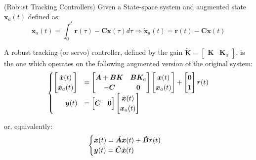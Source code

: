 \documentclass[a4paper,11pt]{book}
\numberwithin{figure}{chapter}
\numberwithin{equation}{chapter}
\numberwithin{table}{chapter}
\theoremstyle{definition}
\newtheorem{definition}{Definition}[chapter]
\newcounter{boxed-theorem}
\newcounter{boxed-definition}
\newenvironment{boxed-definition}[1]
{\begin{shaded} \begin{definition}{#1}}
{\end{definition} \end{shaded}}
\begin{document}
\begin{boxed-definition}{(Robust Tracking Controllers)} \label{def:robustTracking}
	Given a State-space system and augmented state $\bm{x}_a(t)$ defined as:
	\begin{equation}
		\bm{x}_a(t) = \int_{0}^{t} \bm{r}(\tau) - \bm{C} \bm{x}(\tau) d\tau \Longrightarrow \dot{\bm{x}}_a(t) = \bm{r}(t) - \bm{C} \bm{x}(t)
	\end{equation}
	
	A robust tracking (or servo) controller, defined by the gain $\tilde{\bm{K}} = \begin{bmatrix} \bm{K} & \bm{K}_a \end{bmatrix}$, is the one which operates on the following augmented version of the original system:
	\begin{align} \label{eq:augmentedSystem}
	\begin{cases}
		\begin{bmatrix}
			\dot{\bm{x}}(t) \\
			\dot{\bm{x}}_a(t)
		\end{bmatrix} &= \begin{bmatrix}
			\bm{A} + \bm{B} \bm{K} & \bm{B} \bm{K}_a \\ - \bm{C} & \bm{0}
		\end{bmatrix} \begin{bmatrix}
			\bm{x}(t) \\
			\bm{x}_a(t)
		\end{bmatrix} + \begin{bmatrix}
			\bm{0} \\
			\bm{1}
		\end{bmatrix} \bm{r}(t)
		\\
		\hfill \bm{y}(t) &= \begin{bmatrix}
			\bm{C} & \bm{0}
		\end{bmatrix} \begin{bmatrix}
			\bm{x}(t) \\
			\bm{x}_a(t)
		\end{bmatrix}
	\end{cases}
	\end{align}
	
	or, equivalently:
	\begin{align}
	\begin{cases}
		\tilde{\bm{x}}(t) = \tilde{\bm{A}} \tilde{\bm{x}}(t) + \tilde{\bm{B}} \tilde{\bm{r}}(t) \\
		\bm{y}(t) = \tilde{\bm{C}} \tilde{\bm{x}}(t) \hfill
	\end{cases}
	\end{align}
\end{boxed-definition}
\end{document}
